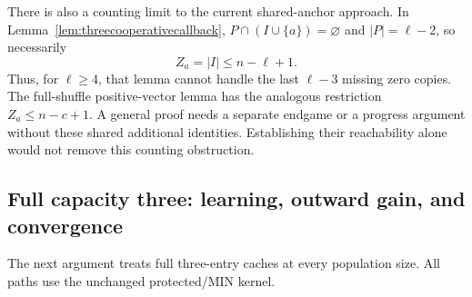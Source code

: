 \documentclass[11pt]{article}
\begin{document}
There is also a counting limit to the current
shared-anchor approach. In
Lemma~\ref{lem:threecooperativecallback},
$P\cap(I\cup\{a\})=\varnothing$ and $|P|=\ell-2$,
so necessarily
\[
 Z_a=|I|\le n-\ell+1.
\]
Thus, for $\ell\ge4$, that lemma cannot handle the
last $\ell-3$ missing zero copies. The full-shuffle
positive-vector lemma has the analogous restriction
$Z_a\le n-c+1$. A general proof needs a separate
endgame or a progress argument without these shared
additional identities. Establishing their reachability
alone would not remove this counting obstruction.

\subsection{Full capacity three: learning, outward gain, and convergence}

The next argument treats full three-entry caches at every population size.
All paths use the unchanged protected/MIN kernel.
\end{document}
